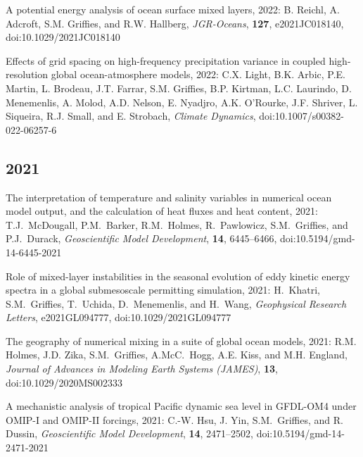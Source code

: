 \begin{etaremune}
\item A potential energy analysis of ocean surface mixed layers, 2022: B. Reichl, A. Adcroft, S.M. Grif\/f\/ies, and R.W. Hallberg, {\it JGR-Oceans}, {\bf 127}, e2021JC018140, doi:10.1029/2021JC018140

\item Effects of grid spacing on high-frequency precipitation variance in coupled high-resolution global ocean-atmosphere models, 2022: C.X. Light, B.K. Arbic, P.E. Martin, L. Brodeau, J.T. Farrar, S.M. Grif\/f\/ies, B.P. Kirtman, L.C. Laurindo,  D. Menemenlis, A. Molod, A.D. Nelson, E. Nyadjro, A.K. O'Rourke,  J.F. Shriver, L. Siqueira, R.J. Small, and E. Strobach, {\it Climate Dynamics}, doi:10.1007/s00382-022-06257-6


\subsection*{\sc \color{Maroon} 2021}

\item The interpretation of temperature and salinity variables in numerical ocean model output, and the calculation of heat fluxes and heat content, 2021: T.J.\ McDougall, P.M.\ Barker, R.M.\ Holmes, R.\ Pawlowicz, S.M.\ Grif\/f\/ies, and P.J.\ Durack, {\it Geoscientific Model Development}, {\bf 14}, 6445–6466, doi:10.5194/gmd-14-6445-2021



\item Role of mixed-layer instabilities in the seasonal evolution of eddy kinetic energy spectra in a global submesoscale permitting simulation, 2021: H.\ Khatri, S.M.\ Grif\/f\/ies, T.\ Uchida, D.\ Menemenlis, and H.\ Wang, {\it  Geophysical Research Letters}, e2021GL094777, doi:10.1029/2021GL094777

\item The geography of numerical mixing in a suite of global ocean models, 2021: R.M. Holmes, J.D. Zika, S.M.\ Grif\/f\/ies,  A.McC.\ Hogg, A.E. Kiss, and M.H. England, {\it Journal of Advances in Modeling Earth Systems (JAMES)}, {\bf 13},  \\ doi:10.1029/2020MS002333

\item A mechanistic analysis of tropical Pacific dynamic sea level in GFDL-OM4 under OMIP-I and OMIP-II forcings, 2021: C.-W. Hsu, J. Yin, S.M.\ Grif\/f\/ies, and R. Dussin, {\it Geoscientific Model Development}, {\bf 14}, 2471--2502, doi:10.5194/gmd-14-2471-2021


\end{etaremune}
